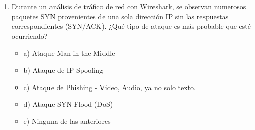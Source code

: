 \documentclass[a4paper]{article}
\begin{document}
\begin{enumerate}
    \item Durante un análisis de tráfico de red con Wireshark, se observan numerosos paquetes SYN provenientes de una sola dirección IP sin las respuestas correspondientes (SYN/ACK). ¿Qué tipo de ataque es más probable que esté ocurriendo?
    \begin{itemize}
        \item a) Ataque Man-in-the-Middle
        \item b) Ataque de IP Spoofing
        \item c) Ataque de Phishing - Video, Audio, ya no solo texto.
        \item d) Ataque SYN Flood (DoS)
        \item e) Ninguna de las anteriores
    \end{itemize}
    

\end{enumerate}
\end{document}
